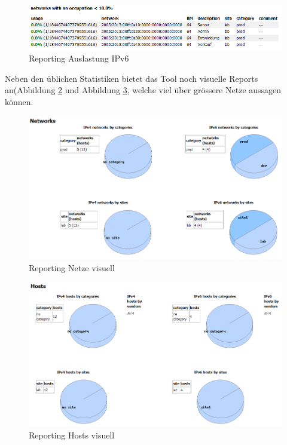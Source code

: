 \documentclass[11pt,a4paper,parskip=half]{scrartcl}
\begin{document}
\begin{figure}[H]
\centering
\includegraphics[width=1.0\textwidth]{Phase3/Report_Netz_Auslastung_IPv6.PNG}
\caption{Reporting Auslastung IPv6}
\label{fig:auslastung_ipv6}
\end{figure}

Neben den üblichen Statistiken bietet das Tool noch visuelle Reports an(Abbildung \ref{fig:visual_netz} und Abbildung \ref{fig:visual_host}, welche viel über grössere Netze aussagen können.
\begin{figure}[H]
\centering
\includegraphics[width=1.0\textwidth]{Phase3/Report_Network_Visualized.PNG}
\caption{Reporting Netze visuell}
\label{fig:visual_netz}
\end{figure}

\begin{figure}[H]
\centering
\includegraphics[width=1.0\textwidth]{Phase3/Report_Hosts_Visualized.PNG}
\caption{Reporting Hosts visuell}
\label{fig:visual_host}
\end{figure}
\end{document}

